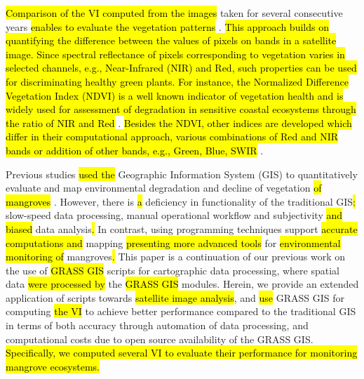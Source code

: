 \documentclass[jmse,article,submit,pdftex,moreauthors]{Definitions/mdpi}
\begin{document}
\hl{Comparison of the VI computed from the images} taken for several consecutive years \hl{enables to evaluate the vegetation patterns} \cite{OCHEGE2017211,Lemenkova202229}. \hl{This approach builds on quantifying the difference between the values of pixels on bands in a satellite image. Since spectral reflectance of pixels corresponding to vegetation varies in selected channels, e.g., Near-Infrared (NIR) and Red, such properties can be used for discriminating healthy green plants. For instance, the Normalized Difference Vegetation Index (NDVI) is a well known indicator of vegetation health and is widely used for assessment of degradation in sensitive coastal ecosystems through the ratio of NIR and Red} \cite{alademomi2020assessing,NSE2020e00599}. \hl{Besides the NDVI, other indices are developed which differ in their computational approach, various combinations of Red and NIR bands or addition of other bands, e.g., Green, Blue, SWIR} \cite{Adamu,rs10060897}. 

Previous studies \hl{used the} Geographic Information System (GIS) to quantitatively evaluate and map environmental degradation\hl{ }and decline of vegetation \hl{of mangroves} \cite{NUMBERE2022433,FASHAE2022e01286,Olorunfemi,Fagbeja,Enaruvbe2015}. However, there is \hl{a }deficiency in functionality of the traditional GIS\hl{: }slow-speed data processing, manual operational workflow and subjectivity \hl{and biased} data analysis\hl{. }In contrast, using\hl{ }programming techniques support \hl{accurate computations and } mapping \cite{9883588,Lemenkova202227,9884244,Lemenkova202230,9964623} \hl{presenting more advanced tools }for \hl{environmental monitoring of }mangroves\hl{. }This paper is a continuation of our previous work \cite{technologies11020046} on the use of \hl{GRASS GIS} scripts for cartographic data processing, where\hl{ }spatial data \hl{were processed by} the\hl{ GRASS GIS }modules. Herein, we provide an extended application of scripts towards \hl{satellite image analysis}, and \hl{use} GRASS GIS for computing \hl{the VI} to achieve better performance compared to the traditional GIS in terms of both accuracy through automation of data processing, and computational costs due to open source availability of the GRASS GIS. \hl{Specifically, we computed several VI to evaluate their performance for monitoring mangrove ecosystems.} 
\end{document}
